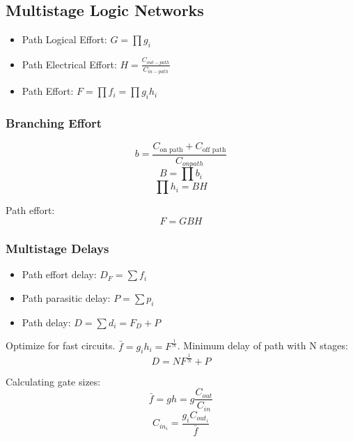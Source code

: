 \subsection{Multistage Logic Networks}
\begin{itemize}
    \itemsep0em
    \item Path Logical Effort: $G = \prod g_i$
    \item Path Electrical Effort: $H = \frac{C_{out-path}}{C_{in-path}}$
    \item Path Effort: $F = \prod f_i = \prod g_i h_i$
\end{itemize}

    \subsubsection{Branching Effort}
    \begin{equation}
        b = \frac{C_{\text{on path}} + C_{\text{off path}}}{C_{on path}}
    \end{equation}
    \begin{equation}
        B = \prod b_i
    \end{equation}
    \begin{equation}
        \prod h_i = BH
    \end{equation}

Path effort:
\begin{equation}
    F = GBH
\end{equation}
    \subsubsection{Multistage Delays}
    \begin{itemize}
        \itemsep0em
        \item Path effort delay: $D_F = \sum f_i$
        \item Path parasitic delay: $P = \sum p_i$ 
        \item Path delay: $D = \sum d_i = F_D + P$
    \end{itemize}

Optimize for fast circuits. $\bar{f} = g_ih_i = F^{\frac{1}{N}}$. Minimum delay of path with N stages:
\begin{equation}
    D = NF^{\frac{1}{N}} + P
\end{equation}

Calculating gate sizes:
\begin{equation}
    \bar{f} = gh = g \frac{C_{out}}{C_{in}}
\end{equation}
\begin{equation}
    C_{in_i} = \frac{g_i C_{out_i}}{\bar{f}}
\end{equation}

